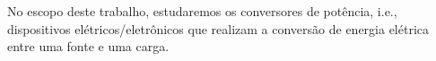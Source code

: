 No escopo deste trabalho, estudaremos os conversores de potência, i.e., dispositivos elétricos/eletrônicos que realizam a conversão de energia elétrica entre uma fonte e uma carga.

